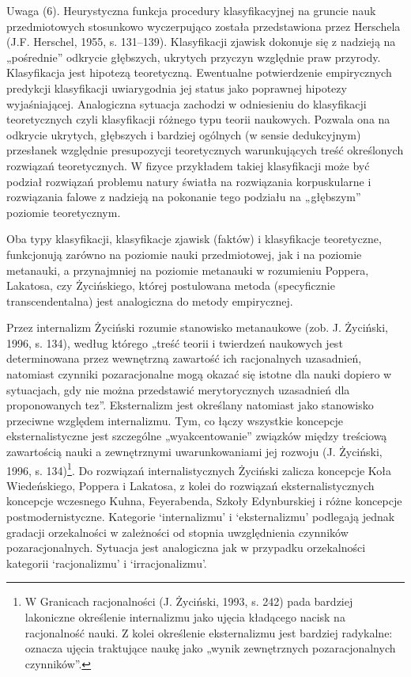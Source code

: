 \documentclass{article}
\begin{document}
Uwaga (6). Heurystyczna funkcja procedury klasyfikacyjnej na gruncie nauk przedmiotowych stosunkowo wyczerpująco została
przedstawiona przez Herschela \label{ref:RND1u8fbCVzxR}(J.F. Herschel, 1955, s. 131–139). Klasyfikacji zjawisk dokonuje
się z nadzieją na „pośrednie” odkrycie głębszych, ukrytych przyczyn względnie praw przyrody. Klasyfikacja jest hipotezą
teoretyczną. Ewentualne potwierdzenie empirycznych predykcji klasyfikacji uwiarygodnia jej status jako poprawnej
hipotezy wyjaśniającej. Analogiczna sytuacja zachodzi w odniesieniu do klasyfikacji teoretycznych czyli klasyfikacji
różnego typu teorii naukowych. Pozwala ona na odkrycie ukrytych, głębszych i bardziej ogólnych (w sensie dedukcyjnym)
przesłanek względnie presupozycji teoretycznych warunkujących treść określonych rozwiązań teoretycznych. W fizyce
przykładem takiej klasyfikacji może być podział rozwiązań problemu natury światła na rozwiązania korpuskularne i
rozwiązania falowe z nadzieją na pokonanie tego podziału na „głębszym” poziomie teoretycznym.

Oba typy klasyfikacji, klasyfikacje zjawisk (faktów) i klasyfikacje teoretyczne, funkcjonują zarówno na poziomie nauki
przedmiotowej, jak i na poziomie metanauki, a przynajmniej na poziomie metanauki w rozumieniu Poppera, Lakatosa, czy
Życińskiego, której postulowana metoda (specyficznie transcendentalna) jest analogiczna do metody empirycznej.

Przez internalizm Życiński rozumie stanowisko metanaukowe \label{ref:RNDCyQqUrHYuu}(zob. J. Życiński, 1996, s. 134),
według którego „treść teorii i twierdzeń naukowych jest determinowana przez wewnętrzną zawartość ich racjonalnych
uzasadnień, natomiast czynniki pozaracjonalne mogą okazać się istotne dla nauki dopiero w sytuacjach, gdy nie można
przedstawić merytorycznych uzasadnień dla proponowanych tez”.  Eksternalizm jest określany natomiast jako stanowisko
przeciwne względem internalizmu. Tym, co łączy wszystkie koncepcje eksternalistyczne jest szczególne „wyakcentowanie”
związków między treściową zawartością nauki a zewnętrznymi uwarunkowaniami jej rozwoju \label{ref:RNDuAc97ED1Y1}(J.
Życiński, 1996, s. 134)\footnote{W Granicach racjonalności \label{ref:RND1EgQJ3J1nD}(J. Życiński, 1993, s. 242) pada
bardziej lakoniczne określenie internalizmu jako ujęcia kładącego nacisk na racjonalność nauki. Z kolei określenie
eksternalizmu jest bardziej radykalne: oznacza ujęcia traktujące naukę jako „wynik zewnętrznych pozaracjonalnych
czynników”.}. Do rozwiązań internalistycznych Życiński zalicza koncepcje Koła Wiedeńskiego, Poppera i Lakatosa, z kolei
do rozwiązań eksternalistycznych koncepcje wczesnego Kuhna, Feyerabenda, Szkoły Edynburskiej i różne koncepcje
postmodernistyczne. Kategorie ‘internalizmu’ i ‘eksternalizmu’ podlegają jednak gradacji orzekalności w zależności od
stopnia uwzględnienia czynników pozaracjonalnych. Sytuacja jest analogiczna jak w przypadku orzekalności kategorii
‘racjonalizmu’ i ‘irracjonalizmu’.
\end{document}
